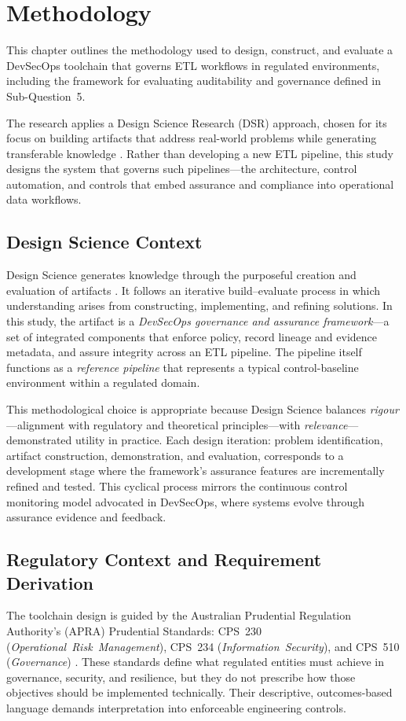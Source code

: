 \chapter{Methodology}
\noindent
This chapter outlines the methodology used to design, construct, and evaluate a
DevSecOps toolchain that governs ETL workflows in regulated environments,
including the framework for evaluating auditability and governance defined in
Sub-Question~5.

The research applies a Design Science Research (DSR) approach, chosen for its focus
on building artifacts that address real-world problems while generating
transferable knowledge \cite{hevner_design_2004}. Rather than developing a new
ETL pipeline, this study designs the system that governs such pipelines—the
architecture, control automation, and controls that embed assurance and
compliance into operational data workflows.

\section{Design Science Context}
\noindent
Design Science generates knowledge through the purposeful creation and
evaluation of artifacts \cite{peffers_design_2007}. It follows an iterative
build–evaluate process in which understanding arises from constructing,
implementing, and refining solutions. In this study, the artifact is a
\textit{DevSecOps governance and assurance framework}—a set of integrated
components that enforce policy, record lineage and evidence metadata, and assure
integrity across an ETL pipeline. The pipeline itself functions as a
\textit{reference pipeline} that represents a typical control-baseline
environment within a regulated domain.

This methodological choice is appropriate because Design Science balances
\textit{rigour}—alignment with regulatory and theoretical principles—with
\textit{relevance}—demonstrated utility in practice. Each design iteration:
problem identification, artifact construction, demonstration, and evaluation,
corresponds to a development stage where the framework’s assurance features are
incrementally refined and tested. This cyclical process mirrors the continuous
control monitoring model advocated in DevSecOps, where systems evolve through
assurance evidence and feedback.

\section{Regulatory Context and Requirement Derivation}
\noindent
The toolchain design is guided by the Australian Prudential Regulation
Authority’s (APRA) Prudential Standards: CPS~230
(\textit{Operational~Risk~Management}), CPS~234
(\textit{Information~Security}), and CPS~510 (\textit{Governance})
\cite{cps230,cps234,cps510}. These standards define what regulated entities
must achieve in governance, security, and resilience, but they do not prescribe
how those objectives should be implemented technically. Their descriptive,
outcomes-based language demands interpretation into enforceable engineering
controls.

